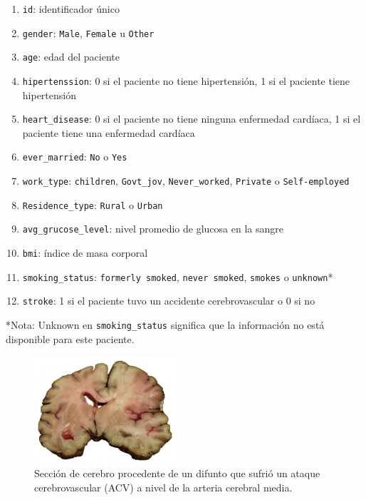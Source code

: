 \documentclass[letter]{article}
\begin{document}
\begin{enumerate}
\item \texttt{id}: identificador único
\item \texttt{gender}: \guillemotleft{}\texttt{Male}\guillemotright{}, \guillemotleft{}\texttt{Female}\guillemotright{} u \guillemotleft{}\texttt{Other}\guillemotright{}
\item \texttt{age}: edad del paciente
\item \texttt{hipertenssion}: 0 si el paciente no tiene hipertensión, 1 si el paciente tiene hipertensión
\item \texttt{heart\_disease}: 0 si el paciente no tiene ninguna enfermedad cardíaca, 1 si el paciente tiene una enfermedad cardíaca
\item \texttt{ever\_married}: \guillemotleft{}\texttt{No}\guillemotright{} o \guillemotleft{}\texttt{Yes}\guillemotright{}
\item \texttt{work\_type}: \guillemotleft{}\texttt{children}\guillemotright{}, \guillemotleft{}\texttt{Govt\_jov}\guillemotright{}, \guillemotleft{}\texttt{Never\_worked}\guillemotright{}, \guillemotleft{}\texttt{Private}\guillemotright{} o \guillemotleft{}\texttt{Self-employed}\guillemotright{}
\item \texttt{Residence\_type}: \guillemotleft{}\texttt{Rural}\guillemotright{} o \guillemotleft{}\texttt{Urban}\guillemotright{}
\item \texttt{avg\_grucose\_level}: nivel promedio de glucosa en la sangre
\item \texttt{bmi}: índice de masa corporal
\item \texttt{smoking\_status}: \guillemotleft{}\texttt{formerly smoked}\guillemotright{}, \guillemotleft{}\texttt{never smoked}\guillemotright{}, \guillemotleft{}\texttt{smokes}\guillemotright{} o \guillemotleft{}\texttt{unknown}\guillemotright{}*
\item \texttt{stroke}: 1 si el paciente tuvo un accidente cerebrovascular o 0 si no
\end{enumerate}

*Nota: \guillemotleft{}Unknown\guillemotright{} en \texttt{smoking\_status} significa que la información no está disponible para este paciente.

\begin{figure}[htbp]
\centering
\includegraphics[width=200px]{./img/stroke.jpg}
\caption{Sección de cerebro procedente de un difunto que sufrió un ataque cerebrovascular (ACV) a nivel de la arteria cerebral media.}
\end{figure}
\end{document}
